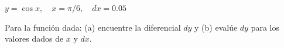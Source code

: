 \item $y = \cos x, \quad x = \pi/6, \quad dx = 0.05$
\par
Para la función dada: (a) encuentre la diferencial $dy$ y (b) evalúe $dy$ para los valores dados de $x$ y $dx$.
